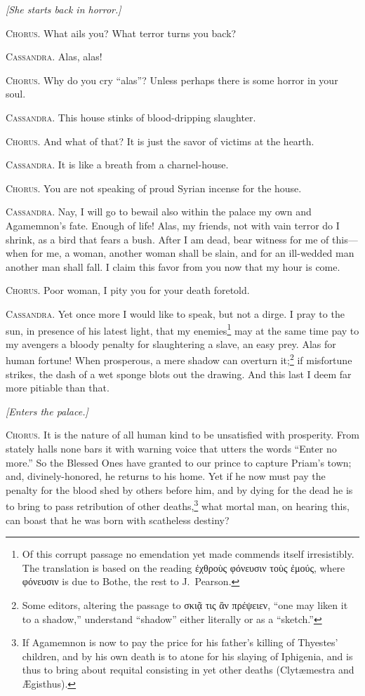 \documentclass[12pt]{article}
\begin{document}
\begin{center}
\textit{[She starts back in horror.]}
\end{center}

\textsc{Chorus.} What ails you? What terror turns you back?

\textsc{Cassandra.} Alas, alas!

\textsc{Chorus.} Why do you cry ``alas''? Unless perhaps there is some horror in your soul.

\textsc{Cassandra.} This house stinks of blood-dripping slaughter.

\textsc{Chorus.} And what of that? It is just the savor of victims at the hearth.

\textsc{Cassandra.} It is like a breath from a charnel-house.

\textsc{Chorus.} You are not speaking of proud Syrian incense for the house.

\textsc{Cassandra.} Nay, I will go to bewail also within the palace my own and Agamemnon's fate. Enough of life! Alas, my friends, not with vain terror do I shrink, as a bird that fears a bush. After I am dead, bear witness for me of this---when for me, a woman, another woman shall be slain, and for an ill-wedded man another man shall fall. I claim this favor from you now that my hour is come.

\textsc{Chorus.} Poor woman, I pity you for your death foretold.

\textsc{Cassandra.} Yet once more I would like to speak, but not a dirge. I pray to the sun, in presence of his latest light, that my enemies\footnote{Of this corrupt passage no emendation yet made commends itself irresistibly. The translation is based on the reading ἐχθροὺς φόνευσιν τοὺς ἐμούς, where φόνευσιν is due to Bothe, the rest to J.~Pearson.} may at the same time pay to my avengers a bloody penalty for slaughtering a slave, an easy prey. Alas for human fortune! When prosperous, a mere shadow can overturn it;\footnote{Some editors, altering the passage to σκιᾷ τις ἂν πρέψειεν, ``one may liken it to a shadow,'' understand ``shadow'' either literally or as a ``sketch.''} if misfortune strikes, the dash of a wet sponge blots out the drawing. And this last I deem far more pitiable than that.

\begin{center}
\textit{[Enters the palace.]}
\end{center}

\textsc{Chorus.} It is the nature of all human kind to be unsatisfied with prosperity. From stately halls none bars it with warning voice that utters the words ``Enter no more.'' So the Blessed Ones have granted to our prince to capture Priam's town; and, divinely-honored, he returns to his home. Yet if he now must pay the penalty for the blood shed by others before him, and by dying for the dead he is to bring to pass retribution of other deaths,\footnote{If Agamemnon is now to pay the price for his father's killing of Thyestes' children, and by his own death is to atone for his slaying of Iphigenia, and is thus to bring about requital consisting in yet other deaths (Clyt{\ae}mestra and {\AE}gisthus).} what mortal man, on hearing this, can boast that he was born with scatheless destiny?
\end{document}
